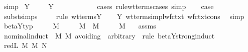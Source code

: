 \begin{isabellebody}
\ simp\isanewline
{}\isamarkupfalse%
\isanewline
{}\isamarkupfalse%
\ {\isacharparenleft}Y\ {\isasymgamma}{\isacharparenright}\isanewline
\ \ \isamarkupfalse%
\ Y{\isacharparenleft}{}{\isacharparenright}\ \isamarkupfalse%
\ {}{\isacharcolon}\ {\isachardoublequoteopen}{\isasymsigma}\ {\isacharequal}\ {\isacharparenleft}{\isasymgamma}\ {\isasymrightarrow}\ {\isasymgamma}{\isacharparenright}\ {\isasymrightarrow}\ {\isasymgamma}{\isachardoublequoteclose}\ \isamarkupfalse%
\ {\isacharparenleft}cases\ rule{\isacharcolon}wt{\isacharunderscore}terms{\isachardot}cases{\isacharcomma}\ simp{\isacharparenright}\isanewline
\ \ \isamarkupfalse%
\ {\isacharquery}case\ \isamarkupfalse%
\ subst{\isachardot}simps\ {}\isanewline
\ \ \isamarkupfalse%
\ {\isacharparenleft}rule\ wt{\isacharunderscore}terms{\isachardot}Y{\isacharparenright}\isanewline
\ \ \isamarkupfalse%
\ Y\ wt{\isacharunderscore}terms{\isacharunderscore}impl{\isacharunderscore}wf{\isacharunderscore}ctxt\ wf{\isacharunderscore}ctxt{\isacharunderscore}cons\ \isamarkupfalse%
\ simp\isanewline
{}\isamarkupfalse%
%
\endisatagproof
{\isafoldproof}%
%
\isadelimproof
\isanewline
%
\endisadelimproof
\isanewline
{}\isamarkupfalse%
\ beta{\isacharunderscore}Y{\isacharunderscore}typ{\isacharcolon}\isanewline
\ \ \ {\isachardoublequoteopen}{\isasymGamma}\ {\isasymturnstile}\ M\ {\isacharcolon}\ {\isasymsigma}{\isachardoublequoteclose}\isanewline
\ \ \ {\isachardoublequoteopen}M\ {\isasymRightarrow}\ M{\isacharprime}{\isachardoublequoteclose}\isanewline
\ \ \ {\isachardoublequoteopen}{\isasymGamma}\ {\isasymturnstile}\ M{\isacharprime}\ {\isacharcolon}\ {\isasymsigma}{\isachardoublequoteclose}\isanewline
%
\isadelimproof
%
\endisadelimproof
%
\isatagproof
{}\isamarkupfalse%
\ assms{\isacharparenleft}{}{\isacharcomma}{}{\isacharparenright}\isanewline
{}\isamarkupfalse%
\ {\isacharparenleft}nominal{\isacharunderscore}induct\ \ M\ M{\isacharprime}\ avoiding{\isacharcolon}\ {\isasymGamma}\ arbitrary{\isacharcolon}\ {\isasymsigma}\ rule{\isacharcolon}\ beta{\isacharunderscore}Y{\isachardot}strong{\isacharunderscore}induct{\isacharparenright}\isanewline
{}\isamarkupfalse%
\ {\isacharparenleft}red{\isacharunderscore}L\ M\ M{\isacharprime}\ N{\isacharparenright}\isanewline
\ \ \isamarkupfalse%

\end{isabellebody}
